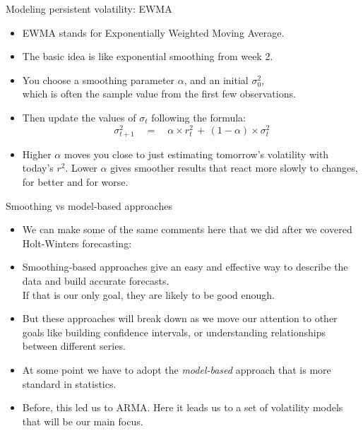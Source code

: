 \documentclass[t,12pt]{beamer}
\begin{document}
\begin{frame}[c]{Modeling persistent volatility: EWMA}
\begin{itemize}
\item EWMA stands for Exponentially Weighted Moving Average.
\medskip
\item The basic idea is like exponential smoothing from week 2.
\medskip
\item You choose a smoothing parameter $\alpha$, and an initial $\sigma_0^2$, 
\\ which is often the sample value from the first few observations.
\medskip
\item Then update the values of $\sigma_t$ following the formula:
$$
\sigma_{t+1}^2 \quad = \quad \alpha \times r_t^2 \, + \, (1-\alpha) \times \sigma_t^2
$$
\item Higher $\alpha$ moves you close to just estimating tomorrow's volatility with today's $r^2$.
Lower $\alpha$ gives smoother results that react more slowly to changes, for better and for worse.
\end{itemize}
\end{frame}

\begin{frame}[c]{Smoothing vs model-based approaches}
\begin{itemize}
\item We can make some of the same comments here that we did after we covered Holt-Winters forecasting:
\item Smoothing-based approaches give an easy and effective way to describe the data and build accurate forecasts. 
\\ If that is our only goal, they are likely to be good enough.
\item But these approaches will break down as we move our attention to other goals like building confidence intervals, or understanding relationships between different series.
\item At some point we have to adopt the \emph{model-based} approach that is more standard in statistics.
\item Before, this led us to ARMA.  Here it leads us to a set of volatility models that will be our main focus.
\end{itemize}
\end{frame}
\end{document}
